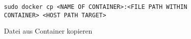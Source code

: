 \documentclass[12pt,a4paper]{article}
\begin{document}
\begin{figure}[H]
\begin{lstlisting}
sudo docker cp <NAME OF CONTAINER>:<FILE PATH WITHIN CONTAINER> <HOST PATH TARGET>
\end{lstlisting}
\caption{Datei aus Container kopieren}\label{fig:Datei aus Container kopieren}
\end{figure}

\newpage
{}
\listoffigures\thispagestyle{fancy}
\end{document}
